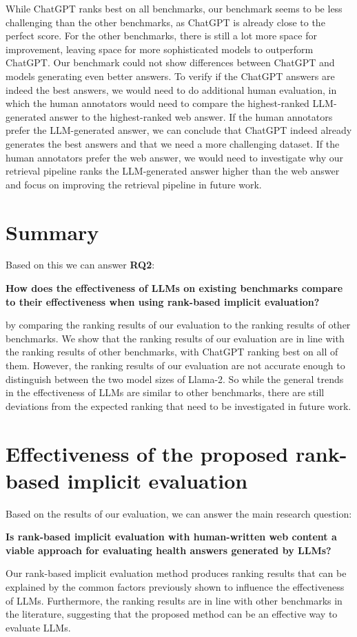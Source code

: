 While ChatGPT ranks best on all benchmarks, our benchmark seems to be less challenging than the other benchmarks, as ChatGPT is already close to the perfect score.
For the other benchmarks, there is still a lot more space for improvement, leaving space for more sophisticated models to outperform ChatGPT.
Our benchmark could not show differences between ChatGPT and models generating even better answers.
To verify if the ChatGPT answers are indeed the best answers, we would need to do additional human evaluation, in which the human annotators would need to compare the highest-ranked LLM-generated answer to the highest-ranked web answer.
If the human annotators prefer the LLM-generated answer, we can conclude that ChatGPT indeed already generates the best answers and that we need a more challenging dataset.
If the human annotators prefer the web answer, we would need to investigate why our retrieval pipeline ranks the LLM-generated answer higher than the web answer and focus on improving the retrieval pipeline in future work.

\section{Summary}
Based on this we can answer \textbf{RQ2}:
\begin{center}
    \textbf{How does the effectiveness of LLMs on existing benchmarks compare to their effectiveness when using rank-based implicit evaluation?}
\end{center}
by comparing the ranking results of our evaluation to the ranking results of other benchmarks.
We show that the ranking results of our evaluation are in line with the ranking results of other benchmarks, with ChatGPT ranking best on all of them.
However, the ranking results of our evaluation are not accurate enough to distinguish between the two model sizes of Llama-2.
So while the general trends in the effectiveness of LLMs are similar to other benchmarks, there are still deviations from the expected ranking that need to be investigated in future work.

\section{Effectiveness of the proposed rank-based implicit evaluation}
Based on the results of our evaluation, we can answer the main research question:
\begin{center}
    \textbf{Is rank-based implicit evaluation with human-written web content a viable approach for evaluating health answers generated by LLMs?}
\end{center}
Our rank-based implicit evaluation method produces ranking results that can be explained by the common factors previously shown to influence the effectiveness of LLMs.
Furthermore, the ranking results are in line with other benchmarks in the literature, suggesting that the proposed method can be an effective way to evaluate LLMs.


